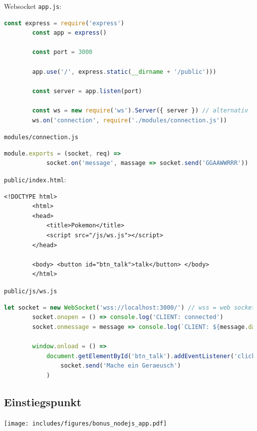 \begin{example}{Websocket}
    \texttt{app.js}:
    \begin{lstlisting}[language=JavaScript]
        const express = require('express')
        const app = express()

        const port = 3000

        app.use('/', express.static(__dirname + '/public')))

        const server = app.listen(port)

        const ws = new require('ws').Server({ server }) // alternativ 'noServer: true'
        ws.on('connection', require('./modules/connection.js'))
    \end{lstlisting}

    \texttt{modules/connection.js}
    \begin{lstlisting}[language=JavaScript]
        module.exports = (socket, req) =>
            socket.on('message', massage => socket.send('GGAAWWRRR'))
    \end{lstlisting}

    \texttt{public/index.html}:
    \begin{lstlisting}[language=HTML5]
        <!DOCTYPE html>
        <html>
        <head>
            <title>Pokemon</title>
            <script src="/js/ws.js"></script>
        </head>

        <body> <button id="btn_talk">talk</button> </body>
        </html>
    \end{lstlisting}

    \texttt{public/js/ws.js}
    \begin{lstlisting}[language=JavaScript]
        let socket = new WebSocket('wss://localhost:3000/') // wss = web socket secure
        socket.onopen = () => console.log('CLIENT: connected')
        socket.onmessage = message => console.log(`CLIENT: ${message.data}`)

        window.onload = () =>
            document.getElementById('btn_talk').addEventListener('click', event =>
                socket.send('Mache ein Geraeusch')
            )
    \end{lstlisting}
\end{example}

\subsection{Einstiegspunkt}

\begin{center}
    \texttt{[image: includes/figures/bonus\_nodejs\_app.pdf]}
\end{center}

